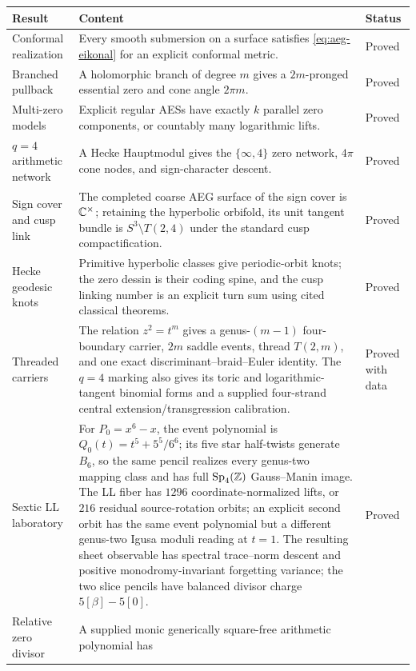 \begin{table}[p]
\centering
\footnotesize
\begin{tabular}{p{}p{}p{}}
\toprule
Result & Content & Status \\
\midrule
Conformal realization & Every smooth submersion on a surface satisfies
\eqref{eq:aeg-eikonal} for an explicit conformal metric. & Proved \\
Branched pullback & A holomorphic branch of degree $m$ gives a $2m$-pronged
essential zero and cone angle $2\pi m$. & Proved \\
Multi-zero models & Explicit regular AESs have exactly $k$ parallel zero
components, or countably many logarithmic lifts. & Proved \\
$q=4$ arithmetic network & A Hecke Hauptmodul gives the $\{\infty,4\}$ zero
network, $4\pi$ cone nodes, and sign-character descent. & Proved \\
Sign cover and cusp link & The completed coarse AEG surface of the sign cover is
$\mathbb{C}^\times$; retaining the hyperbolic orbifold, its unit tangent bundle is
$S^3\setminus T(2,4)$ under the standard cusp compactification. & Proved \\
Hecke geodesic knots & Primitive hyperbolic classes give periodic-orbit knots;
the zero dessin is their coding spine, and the cusp linking number is an explicit
turn sum using cited classical theorems. & Proved \\
Threaded carriers & The relation $z^2=t^m$ gives a genus-$(m-1)$
four-boundary carrier, $2m$ saddle events, thread $T(2,m)$, and one exact
discriminant--braid--Euler identity.  The $q=4$ marking also gives its toric and
logarithmic-tangent binomial forms and a supplied four-strand central
extension/transgression calibration. & Proved with data \\
Sextic LL laboratory & For $P_0=x^6-x$, the event polynomial is
$Q_0(t)=t^5+5^5/6^6$; its five star half-twists generate $B_6$, so the same
pencil realizes every genus-two mapping class and has full
$\operatorname{Sp}_4(\mathbb{Z})$ Gauss--Manin image.  The LL fiber has $1296$
coordinate-normalized lifts, or $216$ residual source-rotation orbits; an
explicit second orbit has the same event polynomial but a different genus-two
Igusa moduli reading at $t=1$.  The resulting sheet observable has spectral
trace--norm descent and positive monodromy-invariant forgetting variance; the
two slice pencils have balanced divisor charge $5[\beta]-5[0]$. &
Proved \\
Relative zero divisor & A supplied monic generically square-free arithmetic polynomial has

\end{tabular}
\end{table}

